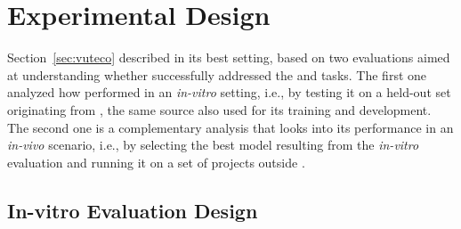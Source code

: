 \section{Experimental Design}
\label{sec:design}


Section~\ref{sec:vuteco} described \vuteco in its best setting, based on two evaluations aimed at understanding whether \vuteco successfully addressed the \finding and \matching tasks.
The first one analyzed how \vuteco performed in an \textit{in-vitro} setting, i.e., by testing it on a held-out set originating from \VulforJ, the same source also used for its training and development.
The second one is a complementary analysis that looks into its performance in an \textit{in-vivo} scenario, i.e., by selecting the best model resulting from the \textit{in-vitro} evaluation and running it on a set of projects outside \VulforJ.








\subsection{In-vitro Evaluation Design}
\label{subsec:invitro}

